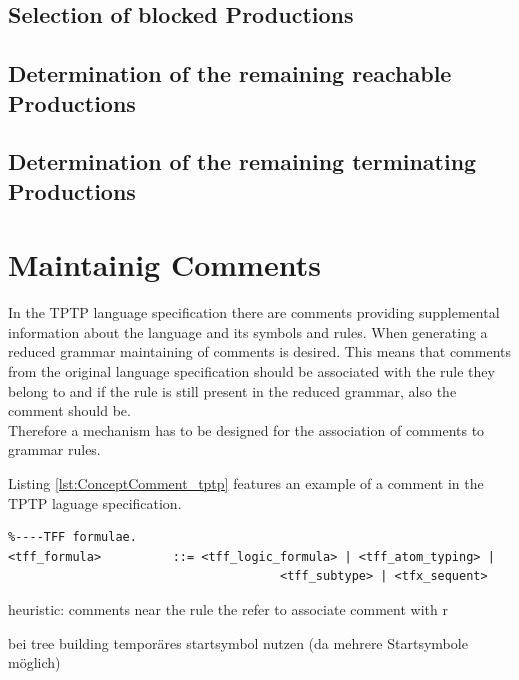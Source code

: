 \subsection{Selection of blocked Productions}

\subsection{Determination of the remaining reachable Productions}

\subsection{Determination of the remaining terminating Productions}

\section{Maintainig Comments}\label{sec:ConceptMaintainingComments}
In the \ac{TPTP} language specification there are comments providing supplemental information about the language and its symbols and rules.
When generating a reduced grammar maintaining of comments is desired. This means that comments from the original language specification should be associated with the rule they belong to and if the rule is still present in the reduced grammar, also the comment should be.\\
Therefore a mechanism has to be designed for the association of comments to grammar rules.

Listing \ref{lst:ConceptComment_tptp} features an example of a comment in the \ac{TPTP} laguage specification.
\begin{lstlisting}[basicstyle=\scriptsize	,caption= Example of a comment in the \ac{TPTP} language specification,label= lst:ConceptComment_tptp]
%----Top of Page---------------------------------------------------------------
%----TFF formulae.
<tff_formula>          ::= <tff_logic_formula> | <tff_atom_typing> |
                           			  <tff_subtype> | <tfx_sequent>
\end{lstlisting}
heuristic:
comments near the rule the refer to
associate comment with r

bei tree building temporäres startsymbol nutzen (da mehrere Startsymbole möglich)

